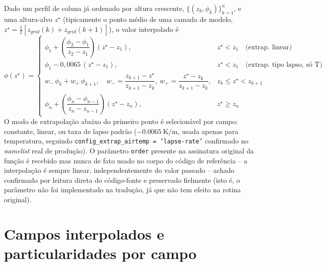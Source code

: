 Dado um perfil de coluna já ordenado por altura crescente,
$\{(z_k, \phi_k)\}_{k=1}^{n}$, e uma altura-alvo $z^\star$
(tipicamente o ponto médio de uma camada de modelo,
$z^\star = \tfrac12[z_{grid}(k) + z_{grid}(k{+}1)]$), o valor
interpolado é
\begin{equation}
  \phi(z^\star) =
  \begin{cases}
    \phi_1 + \left(\dfrac{\phi_2-\phi_1}{z_2-z_1}\right)(z^\star - z_1), & z^\star < z_1 \quad \text{(extrap. linear)} \\[0.8em]
    \phi_1 - 0{,}0065\,(z^\star - z_1), & z^\star < z_1 \quad \text{(extrap. tipo lapso, s\'o T)} \\[0.8em]
    w_-\,\phi_k + w_+\,\phi_{k+1}, \quad w_- = \dfrac{z_{k+1}-z^\star}{z_{k+1}-z_k},\ w_+ = \dfrac{z^\star - z_k}{z_{k+1}-z_k}, & z_k \le z^\star < z_{k+1} \\[0.8em]
    \phi_n + \left(\dfrac{\phi_n-\phi_{n-1}}{z_n-z_{n-1}}\right)(z^\star - z_n), & z^\star \ge z_n
  \end{cases}
  \label{eq:vertical_interp}
\end{equation}
O modo de extrapolação abaixo do primeiro ponto é selecionável por campo:
constante, linear, ou taxa de lapso padrão ($\SI{-0.0065}{\kelvin\per\metre}$,
usada apenas para temperatura, seguindo \texttt{config\_extrap\_airtemp
= 'lapse-rate'} confirmado no \textit{namelist} real de produção). O
parâmetro \texttt{order} presente na assinatura original da função é
recebido mas nunca de fato usado no corpo do código de referência --
a interpolação é sempre linear, independentemente do valor passado --
achado confirmado por leitura direta do código-fonte e preservado
fielmente (isto é, o parâmetro não foi implementado na tradução, já que
não tem efeito na rotina original).

\section{Campos interpolados e particularidades por campo}

